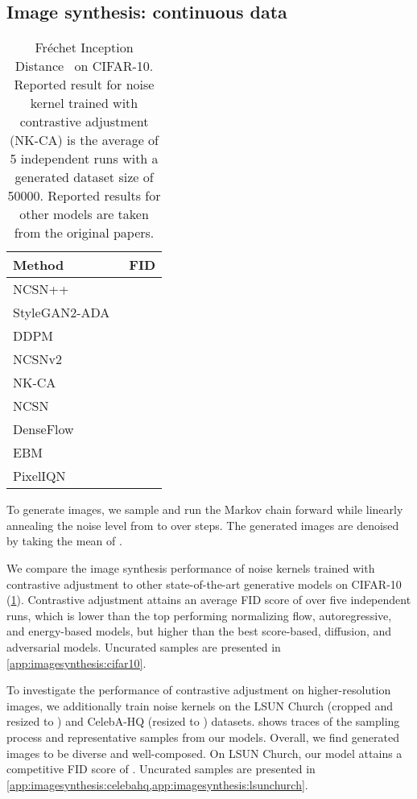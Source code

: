 \documentclass[10pt,twocolumn,letterpaper]{article}
\begin{document}
\subsection{Image synthesis: continuous data}

\begin{table}[t]
  \begin{center}
    \begin{tabular}{lc}
      \toprule
      Method & FID \\
      \midrule
      NCSN++~\cite{song2020score} &  \\
      StyleGAN2-ADA~\cite{karras2020training} &  \\
      DDPM~\cite{ho2020denoising} &  \\
      NCSNv2~\cite{song2020score} &  \\
      NK-CA &  \\
      NCSN~\cite{song2019generative} &  \\
      DenseFlow~\cite{grcic2021densely} &  \\
      EBM~\cite{du2019implicit} &  \\
      PixelIQN~\cite{ostrovski2018autoregressive} &  \\
      \bottomrule
    \end{tabular}
  \end{center}
  \caption{Fréchet Inception Distance~\cite{heusel2017gans} on CIFAR-10.
    Reported result for noise kernel trained with contrastive adjustment (NK-CA) is the average of 5 independent runs with a generated dataset size of \num{50000}.
    Reported results for other models are taken from the original papers.
  }\label{tab:results:cifar}
\end{table}

To generate images, we sample  and run the Markov chain forward while linearly annealing the noise level from  to  over  steps.
The generated images are denoised by taking the mean of .

We compare the image synthesis performance of noise kernels trained with contrastive adjustment to other state-of-the-art generative models on CIFAR-10 (\cref{tab:results:cifar}).
Contrastive adjustment attains an average FID score of  over five independent runs, which is lower than the top performing normalizing flow, autoregressive, and energy-based models, but higher than the best score-based, diffusion, and adversarial models.
Uncurated samples are presented in \cref{app:imagesynthesis:cifar10}.

To investigate the performance of contrastive adjustment on higher-resolution images, we additionally train noise kernels on the LSUN Church (cropped and resized to ) and CelebA-HQ (resized to ) datasets.
 shows traces of the sampling process and representative samples from our models.
Overall, we find generated images to be diverse and well-composed.
On LSUN Church, our model attains a competitive FID score of .
Uncurated samples are presented in \cref{app:imagesynthesis:celebahq,app:imagesynthesis:lsunchurch}.
\end{document}
